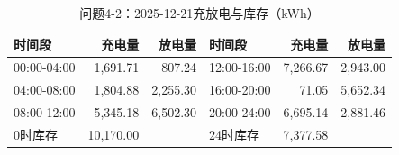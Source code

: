 \begin{table}[H]\centering\small\caption{问题4-2：2025-12-21充放电与库存（kWh）}\label{tab:q4_220251221b}
\begin{tabular}{lrrlrr}\toprule
时间段 & 充电量 & 放电量 & 时间段 & 充电量 & 放电量\\\midrule
00:00-04:00 & 1,691.71 & 807.24 & 12:00-16:00 & 7,266.67 & 2,943.00\\
04:00-08:00 & 1,804.88 & 2,255.30 & 16:00-20:00 & 71.05 & 5,652.34\\
08:00-12:00 & 5,345.18 & 6,502.30 & 20:00-24:00 & 6,695.14 & 2,881.46\\
0时库存 & 10,170.00 &  & 24时库存 & 7,377.58 & \\
\bottomrule\end{tabular}\end{table}
